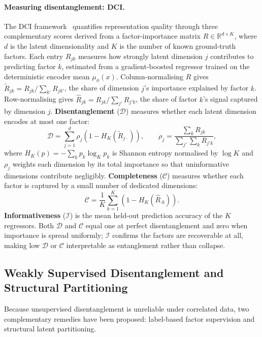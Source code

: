 \paragraph{Measuring disentanglement: DCI.}
The DCI framework~\citep{eastwood2018framework} quantifies representation quality through
three complementary scores derived from a factor-importance matrix $R \in \mathbb{R}^{d
\times K}$, where $d$ is the latent dimensionality and $K$ is the number of known
ground-truth factors. Each entry $R_{jk}$ measures how strongly latent dimension $j$
contributes to predicting factor $k$, estimated from a gradient-boosted regressor trained
on the deterministic encoder mean $\mu_\phi(x)$. Column-normalising $R$ gives
$\tilde{R}_{jk} = R_{jk} / \sum_{k'} R_{jk'}$, the share of dimension $j$'s importance
explained by factor $k$. Row-normalising gives $\hat{R}_{jk} = R_{jk} / \sum_{j'}
R_{j'k}$, the share of factor $k$'s signal captured by dimension $j$.
\textbf{Disentanglement} ($\mathcal{D}$) measures whether each latent dimension encodes
at most one factor:
\begin{equation}
    \mathcal{D} = \sum_{j=1}^{d} \rho_j\!\left(1 - H_K(\tilde{R}_{j\cdot})\right),
    \qquad
    \rho_j = \frac{\sum_k R_{jk}}{\sum_{j'}\sum_k R_{j'k}},
    \label{eq:dci_d}
\end{equation}
where $H_K(p) = -\sum_k p_k \log_K p_k$ is Shannon entropy normalised by $\log K$ and
$\rho_j$ weights each dimension by its total importance so that uninformative dimensions
contribute negligibly. \textbf{Completeness} ($\mathcal{C}$) measures whether each factor
is captured by a small number of dedicated dimensions:
\begin{equation}
    \mathcal{C} = \frac{1}{K}\sum_{k=1}^{K}\!\left(1 - H_K(\hat{R}_{\cdot k})\right).
    \label{eq:dci_c}
\end{equation}
\textbf{Informativeness} ($\mathcal{I}$) is the mean held-out prediction accuracy of the
$K$ regressors. Both $\mathcal{D}$ and $\mathcal{C}$ equal one at perfect disentanglement
and zero when importance is spread uniformly; $\mathcal{I}$ confirms the factors are
recoverable at all, making low $\mathcal{D}$ or $\mathcal{C}$ interpretable as entanglement
rather than collapse.

\subsection{Weakly Supervised Disentanglement and Structural Partitioning}

Because unsupervised disentanglement is unreliable under correlated data, two complementary
remedies have been proposed: label-based factor supervision and structural latent
partitioning.

